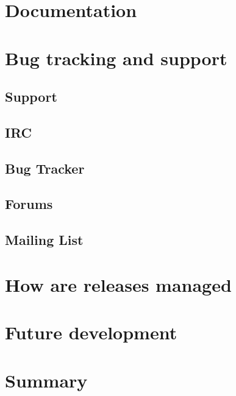 \documentclass{article}
\begin{document}

\section{Documentation} %
\label{sec:documentation}


\section{Bug tracking and support} %
\label{sec:bug_tracking_and_support}

\subsection{Support} %
\label{sub:support}


\subsection{IRC} %
\label{sub:irc}


\subsection{Bug Tracker} %
\label{sub:bug_tracker}


\subsection{Forums} %
\label{sub:forums}


\subsection{Mailing List} %
\label{sub:mailing_list}



\section{How are releases managed} %
\label{sec:how_are_releases_managed}


\section{Future development} %
\label{sec:future_development}


\section{Summary} %
\label{sec:summary}

\end{document}
